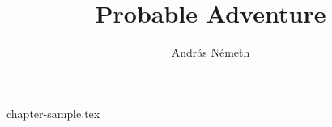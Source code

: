 \documentclass[12pt,a4paper]{book}
\author{András Németh}
\title{Probable Adventure}
\begin{document}
\frontmatter
\maketitle

\tableofcontents

\mainmatter

{chapter-sample.tex}
\end{document}
